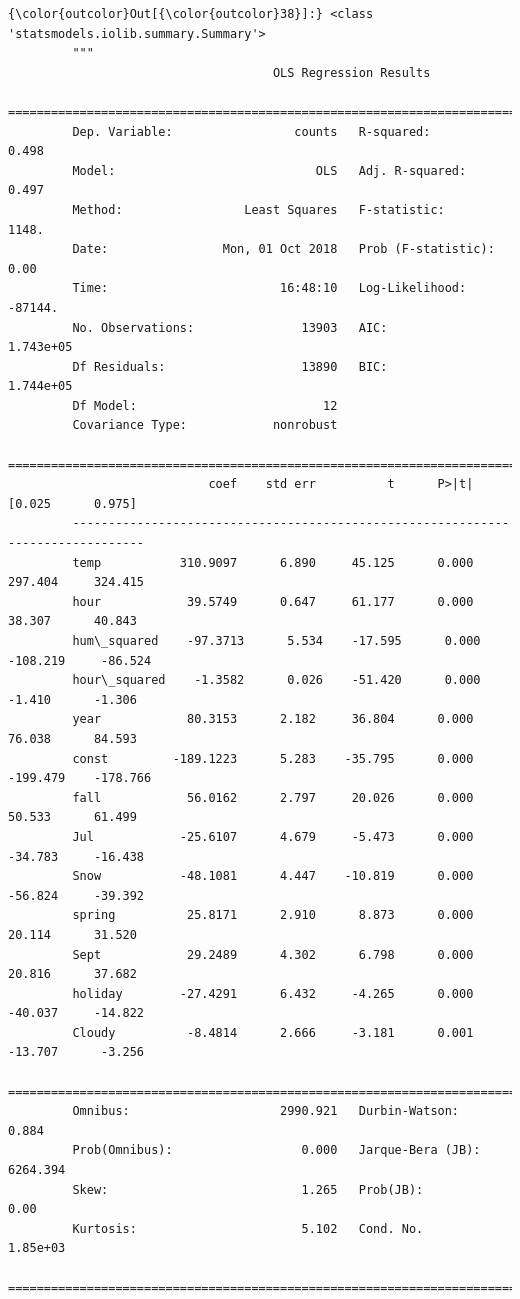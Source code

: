 \documentclass[11pt]{article}
\begin{document}
\begin{Verbatim}[commandchars=\\\{\}]
{\color{outcolor}Out[{\color{outcolor}38}]:} <class 'statsmodels.iolib.summary.Summary'>
         """
                                     OLS Regression Results                            
         ==============================================================================
         Dep. Variable:                 counts   R-squared:                       0.498
         Model:                            OLS   Adj. R-squared:                  0.497
         Method:                 Least Squares   F-statistic:                     1148.
         Date:                Mon, 01 Oct 2018   Prob (F-statistic):               0.00
         Time:                        16:48:10   Log-Likelihood:                -87144.
         No. Observations:               13903   AIC:                         1.743e+05
         Df Residuals:                   13890   BIC:                         1.744e+05
         Df Model:                          12                                         
         Covariance Type:            nonrobust                                         
         ================================================================================
                            coef    std err          t      P>|t|      [0.025      0.975]
         --------------------------------------------------------------------------------
         temp           310.9097      6.890     45.125      0.000     297.404     324.415
         hour            39.5749      0.647     61.177      0.000      38.307      40.843
         hum\_squared    -97.3713      5.534    -17.595      0.000    -108.219     -86.524
         hour\_squared    -1.3582      0.026    -51.420      0.000      -1.410      -1.306
         year            80.3153      2.182     36.804      0.000      76.038      84.593
         const         -189.1223      5.283    -35.795      0.000    -199.479    -178.766
         fall            56.0162      2.797     20.026      0.000      50.533      61.499
         Jul            -25.6107      4.679     -5.473      0.000     -34.783     -16.438
         Snow           -48.1081      4.447    -10.819      0.000     -56.824     -39.392
         spring          25.8171      2.910      8.873      0.000      20.114      31.520
         Sept            29.2489      4.302      6.798      0.000      20.816      37.682
         holiday        -27.4291      6.432     -4.265      0.000     -40.037     -14.822
         Cloudy          -8.4814      2.666     -3.181      0.001     -13.707      -3.256
         ==============================================================================
         Omnibus:                     2990.921   Durbin-Watson:                   0.884
         Prob(Omnibus):                  0.000   Jarque-Bera (JB):             6264.394
         Skew:                           1.265   Prob(JB):                         0.00
         Kurtosis:                       5.102   Cond. No.                     1.85e+03
         ==============================================================================
         

\end{Verbatim}
\end{document}
